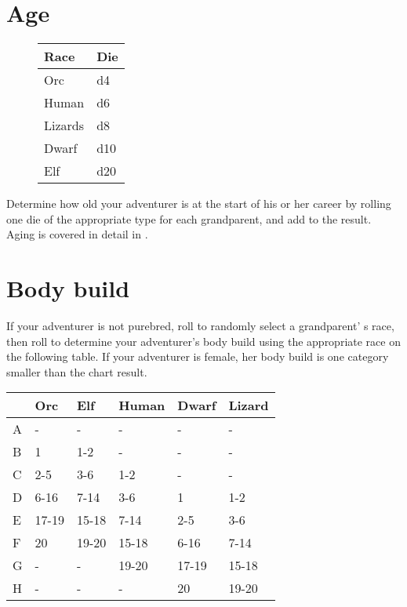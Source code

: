 \begin{multicols*}{2}
\section{Age}
\begin{wrapfigure}[6]{l}[0pt]{60pt}
\begin{normbox}
\small
{}
\begin{tabular}{@{}l l}
\textbf{Race} & \textbf{Die}\\
\midrule
Orc & d4\\
Human & d6\\
Lizards &  d8\\
Dwarf & d10\\
Elf &  d20\\
\end{tabular}
\normalsize
\end{normbox}
\end{wrapfigure}

Determine how old your adventurer is at the start of his or her career by rolling one die of the appropriate type for each grandparent, and add  to the result. Aging is covered in detail in .


\section{Body build}
If your adventurer is not purebred, roll  to randomly select a grandparent' s race, then roll  to determine your adventurer's body build using the appropriate race on the following table. If your adventurer is female, her body build is one category smaller than the chart result.
\begin{normboxc}
\small
\begin{tabular}{@{} l l l l l l }
 & \textbf{Orc} & \textbf{Elf} & \textbf{Human} & \textbf{Dwarf} & \textbf{Lizard}\\
\midrule
A & - & - & - & - & -\\
B & 1 & 1-2 & - & - & -\\
C & 2-5 & 3-6 & 1-2 & - & -\\
D & 6-16 & 7-14 & 3-6 & 1 & 1-2\\
E & 17-19 & 15-18 & 7-14 & 2-5 & 3-6\\
F & 20 & 19-20 & 15-18 & 6-16 & 7-14\\
G & - & - & 19-20 & 17-19 & 15-18\\
H & - & - & - & 20 & 19-20
\end{tabular}
\end{normboxc}

\end{multicols*}
